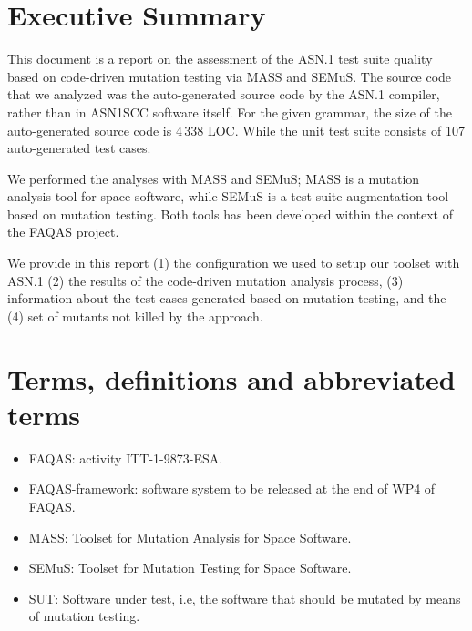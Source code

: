 
\chapter{Executive Summary}

This document is a report on the assessment of the ASN.1 test suite quality based on code-driven mutation testing via MASS and SEMuS. The source code that we analyzed was the auto-generated source code by the ASN.1 compiler, rather than in ASN1SCC software itself. For the given grammar, the size of the auto-generated source code is 4\,338 LOC. While the unit test suite consists of 107 auto-generated test cases.

We performed the analyses with MASS and SEMuS; MASS is a mutation analysis tool for space software, while SEMuS is a test suite augmentation tool based on mutation testing. Both tools has been developed within the context of the FAQAS project.

We provide in this report (1) the configuration we used to setup our toolset with ASN.1 (2) the results of the code-driven mutation analysis process, (3) information about the test cases generated based on mutation testing, and the (4) set of mutants not killed by the approach.




\chapter{Terms, definitions and abbreviated terms}

\begin{itemize}
\item{FAQAS}: activity ITT-1-9873-ESA.
\item{FAQAS-framework}: software system to be released at the end of WP4 of FAQAS.
\item{MASS}: Toolset for Mutation Analysis for Space Software.
\item{SEMuS}: Toolset for Mutation Testing for Space Software.
\item{SUT}: Software under test, i.e, the software that should be mutated by means of mutation testing.

\end{itemize}

\clearpage
